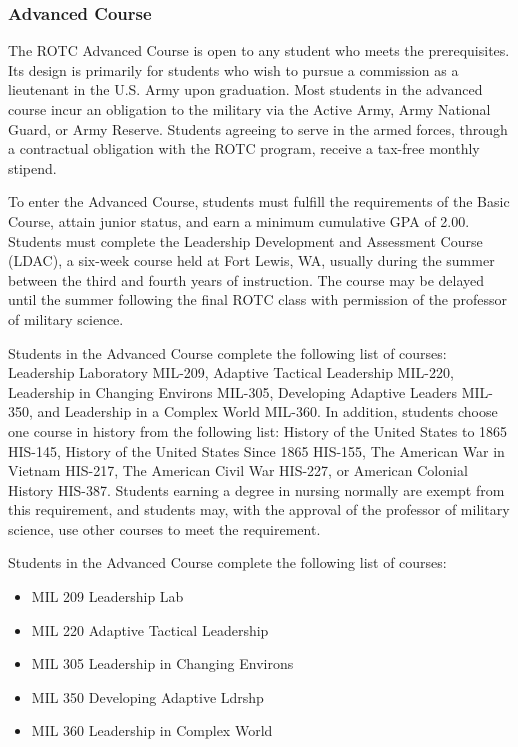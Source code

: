 \documentclass[
  letterpaper,
]{scrbook}
\providecommand{\tightlist}{%
  \setlength{\itemsep}{0pt}\setlength{\parskip}{0pt}}
\begin{document}
\subsubsection{Advanced Course}\label{advanced-course}

The ROTC Advanced Course is open to any student who meets the
prerequisites. Its design is primarily for students who wish to pursue a
commission as a lieutenant in the U.S. Army upon graduation. Most
students in the advanced course incur an obligation to the military via
the Active Army, Army National Guard, or Army Reserve. Students agreeing
to serve in the armed forces, through a contractual obligation with the
ROTC program, receive a tax-free monthly stipend.

To enter the Advanced Course, students must fulfill the requirements of
the Basic Course, attain junior status, and earn a minimum cumulative
GPA of 2.00. Students must complete the Leadership Development and
Assessment Course (LDAC), a six-week course held at Fort Lewis, WA,
usually during the summer between the third and fourth years of
instruction. The course may be delayed until the summer following the
final ROTC class with permission of the professor of military science.

Students in the Advanced Course complete the following list of courses:
Leadership Laboratory MIL-209, Adaptive Tactical Leadership MIL-220,
Leadership in Changing Environs MIL-305, Developing Adaptive Leaders
MIL-350, and Leadership in a Complex World MIL-360. In addition,
students choose one course in history from the following list: History
of the United States to 1865 HIS-145, History of the United States Since
1865 HIS-155, The American War in Vietnam HIS-217, The American Civil
War HIS-227, or American Colonial History HIS-387. Students earning a
degree in nursing normally are exempt from this requirement, and
students may, with the approval of the professor of military science,
use other courses to meet the requirement.

Students in the Advanced Course complete the following list of courses:

\begin{itemize}
\tightlist
\item
  MIL 209 Leadership Lab\\
\item
  MIL 220 Adaptive Tactical Leadership\\
\item
  MIL 305 Leadership in Changing Environs\\
\item
  MIL 350 Developing Adaptive Ldrshp\\
\item
  MIL 360 Leadership in Complex World
\end{itemize}
\end{document}
